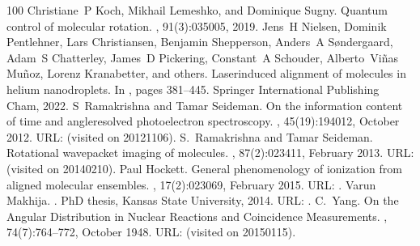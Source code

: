 \documentclass[letterpaper,table,10pt,english]{jupyterBook}
\begin{document}
\begin{sphinxthebibliography}{100}
\sphinxAtStartPar
Christiane P Koch, Mikhail Lemeshko, and Dominique Sugny. Quantum control of molecular rotation. , 91(3):035005, 2019.
\sphinxAtStartPar
Jens H Nielsen, Dominik Pentlehner, Lars Christiansen, Benjamin Shepperson, Anders A Søndergaard, Adam S Chatterley, James D Pickering, Constant A Schouder, Alberto Viñas Muñoz, Lorenz Kranabetter, and others. Laser\sphinxhyphen{}induced alignment of molecules in helium nanodroplets. In , pages 381–445. Springer International Publishing Cham, 2022.
\sphinxAtStartPar
S Ramakrishna and Tamar Seideman. On the information content of time\sphinxhyphen{} and angle\sphinxhyphen{}resolved photoelectron spectroscopy. , 45(19):194012, October 2012. URL:  (visited on 2012\sphinxhyphen{}11\sphinxhyphen{}06).
\sphinxAtStartPar
S. Ramakrishna and Tamar Seideman. Rotational wave\sphinxhyphen{}packet imaging of molecules. , 87(2):023411, February 2013. URL:  (visited on 2014\sphinxhyphen{}02\sphinxhyphen{}10).
\sphinxAtStartPar
Paul Hockett. General phenomenology of ionization from aligned molecular ensembles. , 17(2):023069, February 2015. URL: .
\sphinxAtStartPar
Varun Makhija. . PhD thesis, Kansas State University, 2014. URL: .
\sphinxAtStartPar
C. Yang. On the Angular Distribution in Nuclear Reactions and Coincidence Measurements. , 74(7):764–772, October 1948. URL:  (visited on 2015\sphinxhyphen{}01\sphinxhyphen{}15).
\sphinxAtStartPar

\end{sphinxthebibliography}
\end{document}
